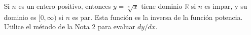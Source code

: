 \item Si $n$ es un entero positivo, entonces $y = \sqrt[n]{x}$ tiene dominio $\mathbb{R}$ si $n$ es impar, y su dominio es $[0, \infty)$ si $n$ es par. Esta función es la inversa de la función potencia. Utilice el método de la Nota 2 para evaluar $dy/dx$.
